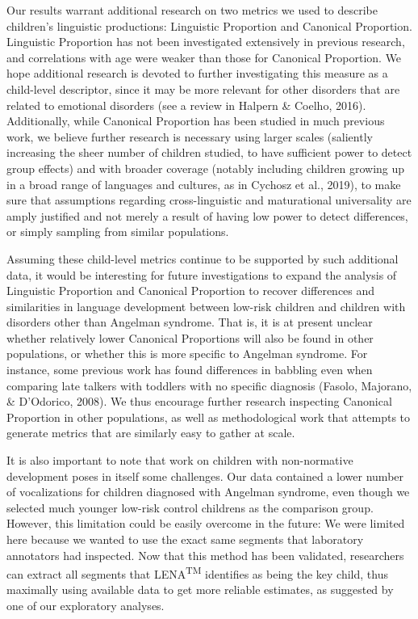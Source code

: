 \documentclass[english,,man,floatsintext]{apa6}
\begin{document}
Our results warrant additional research on two metrics we used to describe children's linguistic productions: Linguistic Proportion and Canonical Proportion. Linguistic Proportion has not been investigated extensively in previous research, and correlations with age were weaker than those for Canonical Proportion. We hope additional research is devoted to further investigating this measure as a child-level descriptor, since it may be more relevant for other disorders that are related to emotional disorders (see a review in Halpern \& Coelho, 2016). Additionally, while Canonical Proportion has been studied in much previous work, we believe further research is necessary using larger scales (saliently increasing the sheer number of children studied, to have sufficient power to detect group effects) and with broader coverage (notably including children growing up in a broad range of languages and cultures, as in Cychosz et al., 2019), to make sure that assumptions regarding cross-linguistic and maturational universality are amply justified and not merely a result of having low power to detect differences, or simply sampling from similar populations.

Assuming these child-level metrics continue to be supported by such additional data, it would be interesting for future investigations to expand the analysis of Linguistic Proportion and Canonical Proportion to recover differences and similarities in language development between low-risk children and children with disorders other than Angelman syndrome. That is, it is at present unclear whether relatively lower Canonical Proportions will also be found in other populations, or whether this is more specific to Angelman syndrome. For instance, some previous work has found differences in babbling even when comparing late talkers with toddlers with no specific diagnosis (Fasolo, Majorano, \& D'Odorico, 2008). We thus encourage further research inspecting Canonical Proportion in other populations, as well as methodological work that attempts to generate metrics that are similarly easy to gather at scale.

It is also important to note that work on children with non-normative development poses in itself some challenges. Our data contained a lower number of vocalizations for children diagnosed with Angelman syndrome, even though we selected much younger low-risk control childrens as the comparison group. However, this limitation could be easily overcome in the future: We were limited here because we wanted to use the exact same segments that laboratory annotators had inspected. Now that this method has been validated, researchers can extract all segments that LENA\textsuperscript{TM} identifies as being the key child, thus maximally using available data to get more reliable estimates, as suggested by one of our exploratory analyses.
\end{document}

